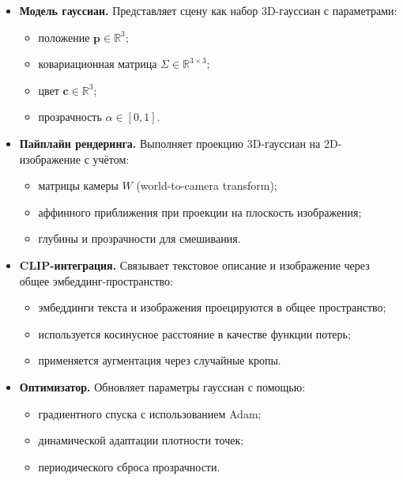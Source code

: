 \begin{itemize}
    \item \textbf{Модель гауссиан.} Представляет сцену как набор 3D-гауссиан с параметрами:
    \begin{itemize}
        \item положение $\mathbf{p} \in \mathbb{R}^3$;
        \item ковариационная матрица $\Sigma \in \mathbb{R}^{3 \times 3}$;
        \item цвет $\mathbf{c} \in \mathbb{R}^3$;
        \item прозрачность $\alpha \in [0,1]$.
    \end{itemize}

    \item \textbf{Пайплайн рендеринга.} Выполняет проекцию 3D-гауссиан на 2D-изображение с учётом:
    \begin{itemize}
        \item матрицы камеры $W$ (world-to-camera transform);
        \item аффинного приближения при проекции на плоскость изображения;
        \item глубины и прозрачности для смешивания.
    \end{itemize}

    \item \textbf{CLIP-интеграция.} Связывает текстовое описание и изображение через общее эмбеддинг-пространство:
    \begin{itemize}
        \item эмбеддинги текста и изображения проецируются в общее пространство;
        \item используется косинусное расстояние в качестве функции потерь;
        \item применяется аугментация через случайные кропы.
    \end{itemize}

    \item \textbf{Оптимизатор.} Обновляет параметры гауссиан с помощью:
    \begin{itemize}
        \item градиентного спуска с использованием Adam;
        \item динамической адаптации плотности точек;
        \item периодического сброса прозрачности.
    \end{itemize}
\end{itemize}

